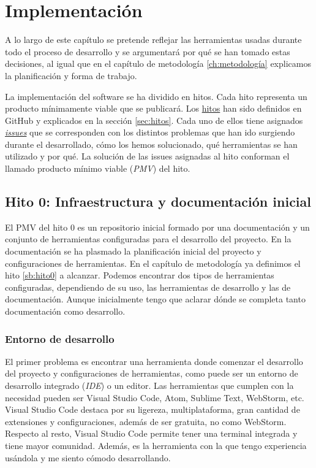 \UseRawInputEncoding
\chapter{Implementación}

A lo largo de este capítulo se pretende reflejar las herramientas usadas durante todo el proceso de desarrollo y
se argumentará por qué se han tomado estas decisiones, al igual que en el capítulo de metodología \ref{ch:metodología} explicamos
la planificación y forma de trabajo.

La implementación del software se ha dividido en hitos. Cada hito representa un producto mínimamente viable que se publicará.
Los \href{https://github.com/RubenDelgadoPareja/TFG-Triage-Inteligente-Consulta-Medica/milestones}{hitos} han sido definidos en GitHub y explicados en la sección \ref{sec:hitos}.
Cada uno de ellos tiene asignados \href{https://github.com/RubenDelgadoPareja/TFG-Triage-Inteligente-Consulta-Medica/issues}{\textit{issues}} que se corresponden
con los distintos problemas que han ido surgiendo durante el desarrollado, cómo los hemos solucionado, qué herramientas se han utilizado y por qué.
La solución de las issues asignadas al hito conforman el llamado producto mínimo viable (\textit{PMV}) del hito.

\section{Hito 0: Infraestructura y documentación inicial}

El PMV del hito 0 es un repositorio inicial formado por una documentación y un conjunto de herramientas configuradas para el desarrollo del proyecto.
En la documentación se ha plasmado la planificación inicial del proyecto y configuraciones de herramientas. En el capítulo de metodología ya definimos el hito \ref{sb:hito0} a alcanzar.
Podemos encontrar dos tipos de herramientas configuradas, dependiendo de su uso, las herramientas de desarrollo y las de documentación.
Aunque inicialmente tengo que aclarar dónde se completa tanto documentación como desarrollo.

\subsection{Entorno de desarrollo}
El primer problema es encontrar una herramienta donde comenzar el desarrollo del proyecto y configuraciones de herramientas, como puede ser un entorno de desarrollo integrado (\textit{IDE}) o un editor.
Las herramientas que cumplen con la necesidad pueden ser Visual Studio Code, Atom, Sublime Text, WebStorm, etc.
Visual Studio Code destaca por su ligereza, multiplataforma, gran cantidad de extensiones y configuraciones, además de ser gratuita, no como WebStorm.
Respecto al resto, Visual Studio Code permite tener una terminal integrada y tiene mayor comunidad. Además, es la herramienta con la que tengo experiencia usándola y me siento cómodo desarrollando.

